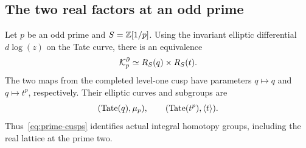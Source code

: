 \subsection{The two real factors at an odd prime}
\begin{lemma}\label{lem:prime-cusps}
Let $p$ be an odd prime and $S=\mathbb Z[1/p]$. Using the invariant elliptic
differential $d\log(z)$ on the Tate curve, there is an equivalence
\begin{equation}\label{eq:prime-cusps}
 \mathcal K_p^\partial\simeq R_S(q)\times R_S(t).
\end{equation}
The two maps from the completed level-one cusp have parameters
$q\mapsto q$ and $q\mapsto t^p$, respectively. Their elliptic curves
and subgroups are
\begin{equation}\label{eq:tate-branches}
 (\operatorname{Tate}(q),\mu_p),\qquad (\operatorname{Tate}(t^p),\langle t\rangle).
\end{equation}
Thus~\eqref{eq:prime-cusps} identifies actual integral homotopy groups,
including the real lattice at the prime two.
\end{lemma}
